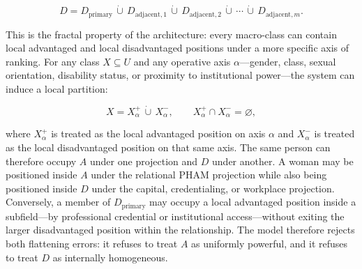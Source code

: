 \documentclass[12pt,openany]{book}
\numberwithin{equation}{chapter}
\begin{document}
\begin{equation}\label{eq:outgroup-internal-partition}
D
=
D_{\text{primary}} \,\dot\cup\, D_{\text{adjacent},1}
\,\dot\cup\, D_{\text{adjacent},2}
\,\dot\cup\, \cdots \,\dot\cup\, D_{\text{adjacent},m}.
\end{equation}

This is the fractal property of the architecture: every macro-class can contain
local advantaged and local disadvantaged positions under a more specific axis of ranking. For
any class $X \subseteq U$ and any operative axis $\alpha$---gender, class, sexual orientation,
disability status, or proximity to institutional power---the system can induce a local partition:

\begin{equation}\label{eq:recursive-local-partition}
X = X^{+}_{\alpha} \,\dot\cup\, X^{-}_{\alpha},
\qquad
X^{+}_{\alpha} \cap X^{-}_{\alpha} = \varnothing ,
\end{equation}

where $X^{+}_{\alpha}$ is treated as the local advantaged position on axis $\alpha$ and
$X^{-}_{\alpha}$ is treated as the local disadvantaged position on that same axis. The same
person can therefore occupy $A$ under one projection and $D$ under another. A
woman may be positioned inside $A$ under the relational PHAM projection while also being positioned inside $D$ under the capital,
credentialing, or workplace projection. Conversely, a member of
$D_{\text{primary}}$ may occupy a local advantaged position inside a
subfield---by professional credential or institutional access---without
exiting the larger disadvantaged position within the relationship. The model therefore rejects both
flattening errors: it refuses to treat $A$ as uniformly powerful, and it refuses to treat $D$ as internally homogeneous.
\end{document}
